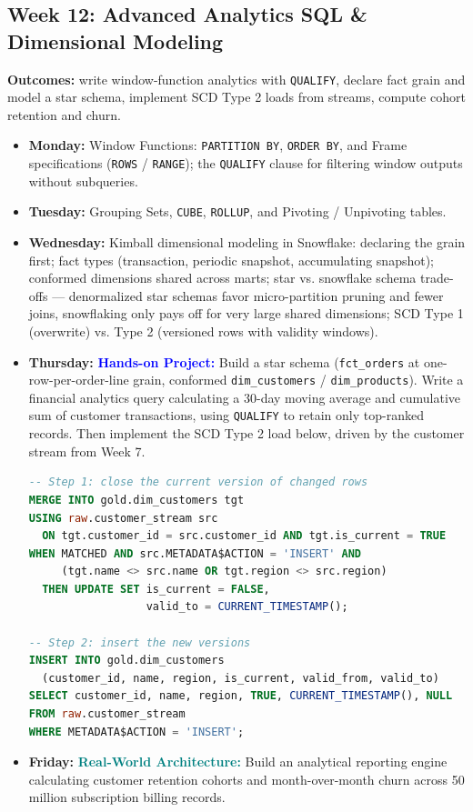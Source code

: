 \documentclass[11pt, a4paper]{article}
\newcommand{\project}[1]{\textbf{\textcolor{blue}{Hands-on Project:}} #1}
\newcommand{\usecase}[1]{\textbf{\textcolor{teal}{Real-World Architecture:}} #1}
\newcommand{\dayitem}[2]{\item \textbf{#1:} #2}
\begin{document}
\subsection*{Week 12: Advanced Analytics SQL \& Dimensional Modeling}
\par\noindent\textbf{Outcomes:} write window-function analytics with \texttt{QUALIFY}, declare fact grain and model a star schema, implement SCD Type 2 loads from streams, compute cohort retention and churn.
\begin{itemize}[label=-]
    \dayitem{Monday}{Window Functions: \texttt{PARTITION BY}, \texttt{ORDER BY}, and Frame specifications (\texttt{ROWS} / \texttt{RANGE}); the \texttt{QUALIFY} clause for filtering window outputs without subqueries.}
    \dayitem{Tuesday}{Grouping Sets, \texttt{CUBE}, \texttt{ROLLUP}, and Pivoting / Unpivoting tables.}
    \dayitem{Wednesday}{Kimball dimensional modeling in Snowflake: declaring the grain first; fact types (transaction, periodic snapshot, accumulating snapshot); conformed dimensions shared across marts; star vs. snowflake schema trade-offs --- denormalized star schemas favor micro-partition pruning and fewer joins, snowflaking only pays off for very large shared dimensions; SCD Type 1 (overwrite) vs. Type 2 (versioned rows with validity windows).}
    \dayitem{Thursday}{\project{Build a star schema (\texttt{fct\_orders} at one-row-per-order-line grain, conformed \texttt{dim\_customers} / \texttt{dim\_products}). Write a financial analytics query calculating a 30-day moving average and cumulative sum of customer transactions, using \texttt{QUALIFY} to retain only top-ranked records. Then implement the SCD Type 2 load below, driven by the customer stream from Week 7.}}
\begin{lstlisting}[language=SQL, caption={SCD Type 2 from a stream: close current rows, then insert new versions}]
-- Step 1: close the current version of changed rows
MERGE INTO gold.dim_customers tgt
USING raw.customer_stream src
  ON tgt.customer_id = src.customer_id AND tgt.is_current = TRUE
WHEN MATCHED AND src.METADATA$ACTION = 'INSERT' AND
     (tgt.name <> src.name OR tgt.region <> src.region)
  THEN UPDATE SET is_current = FALSE,
                  valid_to = CURRENT_TIMESTAMP();

-- Step 2: insert the new versions
INSERT INTO gold.dim_customers
  (customer_id, name, region, is_current, valid_from, valid_to)
SELECT customer_id, name, region, TRUE, CURRENT_TIMESTAMP(), NULL
FROM raw.customer_stream
WHERE METADATA$ACTION = 'INSERT';
\end{lstlisting}
    \dayitem{Friday}{\usecase{Build an analytical reporting engine calculating customer retention cohorts and month-over-month churn across 50 million subscription billing records.}}
\end{itemize}
\end{document}
